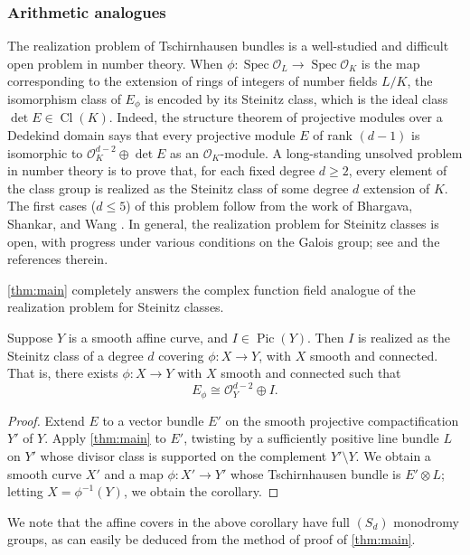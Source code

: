 \documentclass[11 pt]{amsart}
\DeclareMathOperator{\Cl}{Cl}
\renewcommand{\O}{{\mathcal O}}
\providecommand {\from}{{\colon}}
\providecommand{\spec}{\operatorname{Spec}}
\providecommand{\Pic}{\operatorname{Pic}}
\numberwithin{equation}{section}
\begin{document}
\subsubsection{Arithmetic analogues}
The realization problem of Tschirnhausen bundles is a well-studied and difficult open problem in number theory.
When $\phi \from \spec \O_L \to \spec \O_K$ is the map corresponding to the extension of rings of integers of number fields $L/K$, the isomorphism class of $E_\phi$ is encoded by its Steinitz class, which is the ideal class  $\det E \in \Cl (K)$.
Indeed, the structure theorem of projective modules over a Dedekind domain \cite{ser:58} says that every projective module $E$ of rank $(d-1)$ is isomorphic to $\O_K^{d-2} \oplus \det E$ as an $\O_K$-module.
A long-standing unsolved problem in number theory is to prove that, for each fixed degree $d \geq 2$, every element of the class group is realized as the Steinitz class of some degree $d$ extension of $K$.
The first cases ($d \leq 5$) of this problem follow from the work of Bhargava, Shankar, and Wang \cite[Theorem 4]{bha.sha.wan:15}.  
In general, the realization problem for Steinitz classes is open, with progress under various conditions on the Galois group; see \cite{byo.gre.sod-gui:06} and the references therein.

\autoref{thm:main} completely answers the complex function field analogue of the realization problem for Steinitz classes.
\begin{corollary}
  Suppose $Y$ is a smooth affine curve, and $I \in \Pic(Y)$.
  Then $I$ is realized as the Steinitz class of a degree $d$ covering $\phi \from X \to Y$, with $X$ smooth and connected.
  That is, there exists $\phi \from X \to Y$ with $X$ smooth and connected such that
  \[ E_\phi \cong \O_Y^{d-2} \oplus I.\]
\end{corollary}
\begin{proof}
  Extend $E$ to a vector bundle $E'$ on the smooth projective compactification $Y'$ of $Y$. Apply \autoref{thm:main} to $E'$, twisting by a sufficiently positive line bundle $L$ on $Y'$ whose divisor class is supported on the complement $Y' \setminus Y$.  We obtain a smooth curve $X'$ and a map $\phi \from X' \to Y'$ whose Tschirnhausen bundle is $E' \otimes L$; letting $X = \phi^{-1}(Y)$, we obtain the corollary.
\end{proof}
We note that the affine covers in the above corollary have full $(S_d)$ monodromy groups, as can easily be deduced from the method of proof of \autoref{thm:main}.
\end{document}
